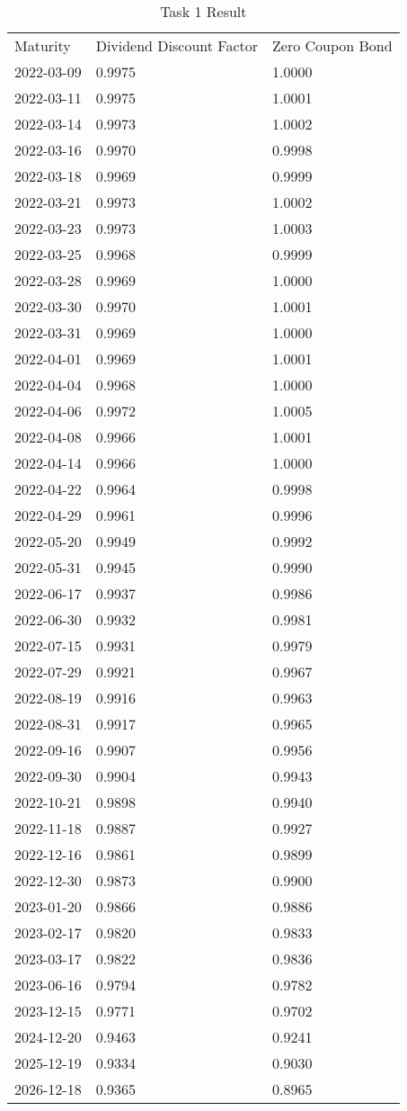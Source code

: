 \begin{table}
\centering
\caption{Task 1 Result}
\label{tab:task1}
\begin{tabular}{l l l}   
Maturity & Dividend Discount Factor & Zero Coupon Bond \\
2022-03-09 & 0.9975 & 1.0000 \\
2022-03-11 & 0.9975 & 1.0001 \\
2022-03-14 & 0.9973 & 1.0002 \\
2022-03-16 & 0.9970 & 0.9998 \\
2022-03-18 & 0.9969 & 0.9999 \\
2022-03-21 & 0.9973 & 1.0002 \\
2022-03-23 & 0.9973 & 1.0003 \\
2022-03-25 & 0.9968 & 0.9999 \\
2022-03-28 & 0.9969 & 1.0000 \\
2022-03-30 & 0.9970 & 1.0001 \\
2022-03-31 & 0.9969 & 1.0000 \\
2022-04-01 & 0.9969 & 1.0001 \\
2022-04-04 & 0.9968 & 1.0000 \\
2022-04-06 & 0.9972 & 1.0005 \\
2022-04-08 & 0.9966 & 1.0001 \\
2022-04-14 & 0.9966 & 1.0000 \\
2022-04-22 & 0.9964 & 0.9998 \\
2022-04-29 & 0.9961 & 0.9996 \\
2022-05-20 & 0.9949 & 0.9992 \\
2022-05-31 & 0.9945 & 0.9990 \\
2022-06-17 & 0.9937 & 0.9986 \\
2022-06-30 & 0.9932 & 0.9981 \\
2022-07-15 & 0.9931 & 0.9979 \\
2022-07-29 & 0.9921 & 0.9967 \\
2022-08-19 & 0.9916 & 0.9963 \\
2022-08-31 & 0.9917 & 0.9965 \\
2022-09-16 & 0.9907 & 0.9956 \\
2022-09-30 & 0.9904 & 0.9943 \\
2022-10-21 & 0.9898 & 0.9940 \\
2022-11-18 & 0.9887 & 0.9927 \\
2022-12-16 & 0.9861 & 0.9899 \\
2022-12-30 & 0.9873 & 0.9900 \\
2023-01-20 & 0.9866 & 0.9886 \\
2023-02-17 & 0.9820 & 0.9833 \\
2023-03-17 & 0.9822 & 0.9836 \\
2023-06-16 & 0.9794 & 0.9782 \\
2023-12-15 & 0.9771 & 0.9702 \\
2024-12-20 & 0.9463 & 0.9241 \\
2025-12-19 & 0.9334 & 0.9030 \\
2026-12-18 & 0.9365 & 0.8965 \\

\end{tabular}

\end{table}
\newpage
